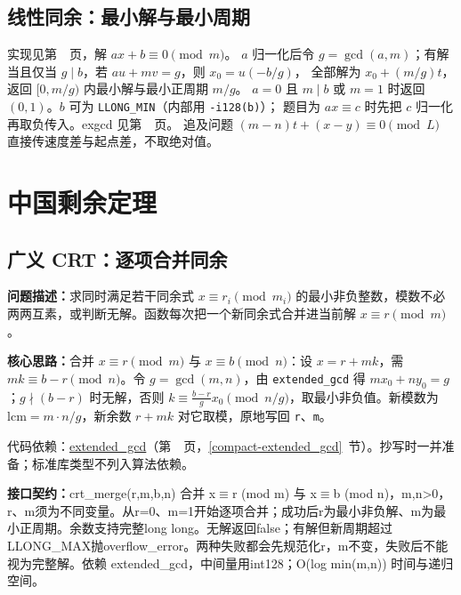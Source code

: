 \subsection{线性同余：最小解与最小周期}\label{knowledge-linear-congruence}
实现见第~\pageref{compact-linear_congruence}~页，解 $ax+b\equiv0\pmod m$。
$a$ 归一化后令 $g=\gcd(a,m)$；有解当且仅当 $g\mid b$，若 $au+mv=g$，则 $x_0=u(-b/g)$，
全部解为 $x_0+(m/g)t$，返回 $[0,m/g)$ 内最小解与最小正周期 $m/g$。
$a=0$ 且 $m\mid b$ 或 $m=1$ 时返回 $(0,1)$。$b$ 可为 \texttt{LLONG\_MIN}（内部用 \texttt{-i128(b)}）；
题目为 $ax\equiv c$ 时先把 $c$ 归一化再取负传入。exgcd 见第~\pageref{knowledge-diophantine-bounds}~页。
追及问题 $(m-n)t+(x-y)\equiv0\pmod L$ 直接传速度差与起点差，不取绝对值。



\Needspace{461pt}

\section{中国剩余定理}

\subsection{广义 CRT：逐项合并同余}\label{compact-crt_merge}

\noindent\textbf{问题描述：}\allowbreak 求同时满足若干同余式 $x\equiv r_i\pmod{m_i}$ 的最小非负整数，模数不必两两互素，或判断无解。函数每次把一个新同余式合并进当前解 $x\equiv r\pmod m$。

\textbf{核心思路：}\allowbreak 合并 $x\equiv r\pmod m$ 与 $x\equiv b\pmod n$：设 $x=r+mk$，需 $mk\equiv b-r\pmod n$。令 $g=\gcd(m,n)$，由 \texttt{extended\_gcd} 得 $mx_0+ny_0=g$；$g\nmid(b-r)$ 时无解，否则 $k\equiv\frac{b-r}{g}x_0\pmod{n/g}$，取最小非负值。新模数为 $\mathrm{lcm}=m\cdot n/g$，新余数 $r+mk$ 对它取模，原地写回 \texttt{r}、\texttt{m}。

代码依赖：\hyperref[compact-extended_gcd]{extended\_\allowbreak{}gcd}（第~\pageref{compact-extended_gcd}~页，\ref{compact-extended_gcd}~节）。抄写时一并准备；标准库类型不列入算法依赖。

{\sloppy{}\noindent\textbf{接口契约：}crt\_merge(r,m,b,n) 合并 x$\equiv$r (mod m) 与 x$\equiv$b (mod n)，m,n>0，r、m须为不同变量。从r=0、m=1开始逐项合并；成功后r为最小非负解、m为最小正周期。余数支持完整long long。无解返回false；有解但新周期超过LLONG\_MAX抛overflow\_error。两种失败都会先规范化r，m不变，失败后不能视为完整解。依赖 extended\_gcd，中间量用int128；O(log min(m,n)) 时间与递归空间。\par}

